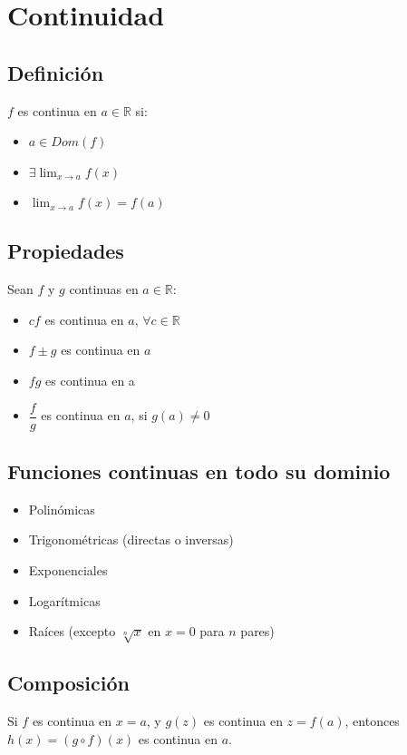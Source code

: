 \documentclass[11pt,titlepage]{article}
\newcommand{\commLim}[2]{\lim_{#1 \to #2}}
\begin{document}
\vspace{1cm}
\section{Continuidad}
\subsection{Definición}
$f$ es continua en $a \in \mathbb{R}$ si:
\begin{itemize}
	\item $a \in Dom(f)$
	\item $\exists \commLim{x}{a} f(x)$
	\item $\commLim{x}{a} f(x) = f(a)$
\end{itemize}

\subsection{Propiedades}
Sean $f$ y $g$ continuas en $a \in \mathbb{R}$:
\begin{multicols}{2}
	\begin{itemize}
		\item $cf$ es continua en $a$, $\forall c \in \mathbb{R}$
		\item $f \pm g$ es continua en $a$
		\item $fg$ es continua en a
		\item $\dfrac{f}{g}$ es continua en $a$, si $g(a) \neq 0$
	\end{itemize}
\end{multicols}
	
\subsection{Funciones continuas en todo su dominio}
\begin{multicols}{2}
	\begin{itemize}
		\item Polinómicas
		\item Trigonométricas (directas o inversas)
		\item Exponenciales
		\item Logarítmicas
		\item Raíces (excepto $\sqrt[n]{x}$ en $x = 0$ para $n$ pares)
	\end{itemize}
\end{multicols}

\subsection{Composición}
Si $f$ es continua en $x=a$, y $g(z)$ es continua en $z=f(a)$, entonces $h(x) = (g\circ f)(x)$ es continua en $a$.
\end{document}
